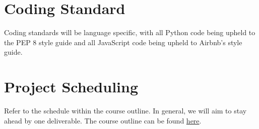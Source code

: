 \documentclass{article}
\begin{document}
\section{Coding Standard}

Coding standards will be language specific, with all Python code being upheld to the PEP 8 style guide and all JavaScript code being upheld to Airbnb's style guide.

\section{Project Scheduling}

Refer to the schedule within the course outline. In general, we will aim to stay ahead by one deliverable.
The course outline can be found \href{https://gitlab.cas.mcmaster.ca/courses/capstone/-/blob/main/CourseOutline/Capstone_Outline.pdf}{here}.
\end{document}
